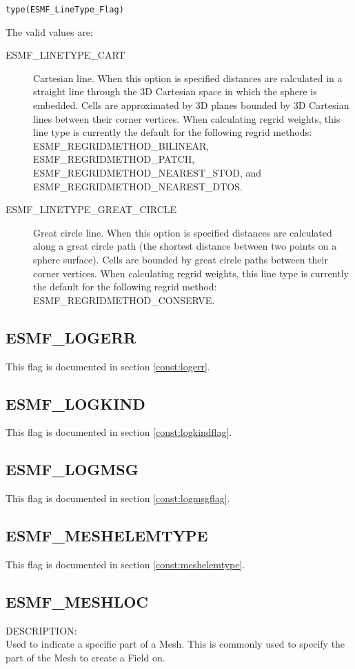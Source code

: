 {\tt type(ESMF\_LineType\_Flag)}

The valid values are:
 \begin{description}
\item [ESMF\_LINETYPE\_CART]
   Cartesian line. When this option is specified distances are calculated in a straight line through the 3D Cartesian space
   in which the sphere is embedded. Cells are approximated by 3D planes bounded by 3D Cartesian lines between their corner vertices. 
   When calculating regrid weights, this line type is currently the default for the following regrid methods: ESMF\_REGRIDMETHOD\_BILINEAR, 
   ESMF\_REGRIDMETHOD\_PATCH, ESMF\_REGRIDMETHOD\_NEAREST\_STOD, and  ESMF\_REGRIDMETHOD\_NEAREST\_DTOS.
\item [ESMF\_LINETYPE\_GREAT\_CIRCLE]
   Great circle line. When this option is specified distances are calculated along a great circle path (the shortest distance
   between two points on a sphere surface). Cells are bounded by great circle paths between their corner vertices. When calculating regrid 
   weights, this line type is currently the default for the following regrid method: ESMF\_REGRIDMETHOD\_CONSERVE. 
\end{description}


\subsection{ESMF\_LOGERR}
This flag is documented in section \ref{const:logerr}.

\subsection{ESMF\_LOGKIND}
This flag is documented in section \ref{const:logkindflag}.

\subsection{ESMF\_LOGMSG}
This flag is documented in section \ref{const:logmsgflag}.

\subsection{ESMF\_MESHELEMTYPE}
This flag is documented in section \ref{const:meshelemtype}.

\subsection{ESMF\_MESHLOC}
\label{const:meshloc}
{\sf DESCRIPTION:\\}  
Used to indicate a specific part of a Mesh. This is commonly used to specify the part of the Mesh to
create a Field on. 

